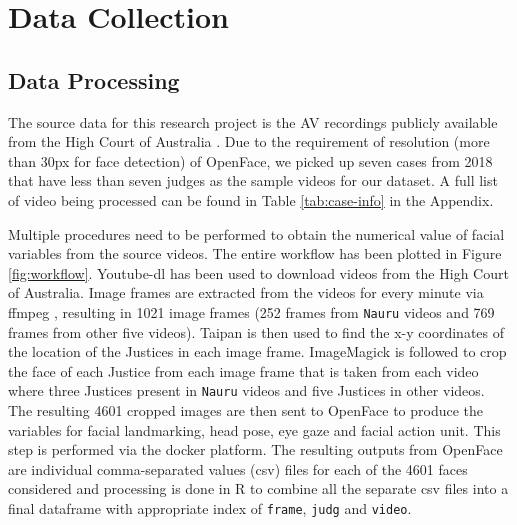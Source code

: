 \documentclass{monashthesis}
\begin{document}
\hypertarget{data-collection}{%
\chapter{Data Collection}\label{data-collection}}

\hypertarget{data-processing}{%
\section{Data Processing}\label{data-processing}}

The source data for this research project is the AV recordings publicly available from the High Court of Australia \autocite{highcourtau}. Due to the requirement of resolution (more than 30px for face detection) of OpenFace, we picked up seven cases from 2018 that have less than seven judges as the sample videos for our dataset. A full list of video being processed can be found in Table \ref{tab:case-info} in the Appendix.

Multiple procedures need to be performed to obtain the numerical value of facial variables from the source videos. The entire workflow has been plotted in Figure \ref{fig:workflow}. Youtube-dl \autocite{youtube-dl} has been used to download videos from the High Court of Australia\autocite{highcourtau}. Image frames are extracted from the videos for every minute via ffmpeg \autocite{ffmpeg}, resulting in 1021 image frames (252 frames from \texttt{Nauru} videos and 769 frames from other five videos). Taipan \autocite{Taipan} is then used to find the x-y coordinates of the location of the Justices in each image frame. ImageMagick \autocite{ImageMagick} is followed to crop the face of each Justice from each image frame that is taken from each video where three Justices present in \texttt{Nauru} videos and five Justices in other videos. The resulting 4601 cropped images are then sent to OpenFace \autocite{baltrusaitis2018openface} to produce the variables for facial landmarking, head pose, eye gaze and facial action unit. This step is performed via the docker platform. The resulting outputs from OpenFace are individual comma-separated values (csv) files for each of the 4601 faces considered and processing is done in R to combine all the separate csv files into a final dataframe with appropriate index of \texttt{frame}, \texttt{judg} and \texttt{video}.
\end{document}
